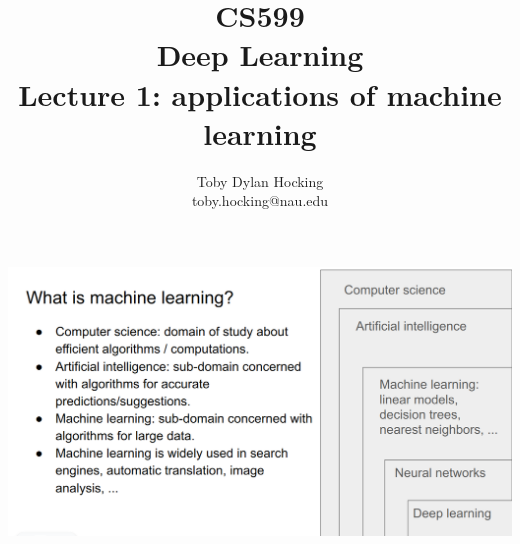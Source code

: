 \documentclass{beamer}
\begin{document}
\title{CS599\\Deep Learning
\\Lecture 1: applications of machine learning}
\author{
  Toby Dylan Hocking\\
  toby.hocking@nau.edu
}


\maketitle



\begin{frame}
  \includegraphics[width=\textwidth]{figure-ai-vs-ml}
\end{frame}
\end{document}
